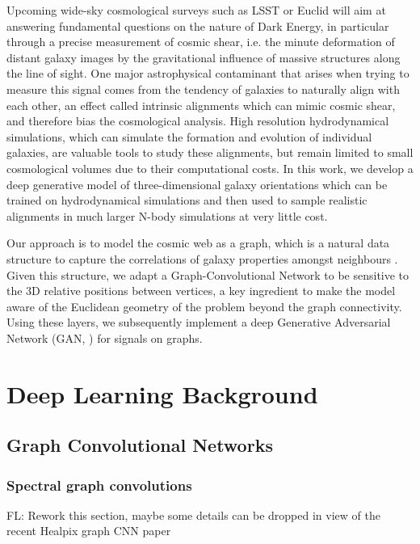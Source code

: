 \documentclass[a4paper,fleqn,usenatbib]{mnras}
\newcommand{\fl}[1]{{\color{magenta}FL: #1}}
\begin{document}
Upcoming wide-sky cosmological surveys such as LSST or Euclid will aim at answering fundamental questions on the 
nature of Dark Energy, in particular through a precise measurement of cosmic shear, i.e. the minute deformation of distant
galaxy images by the gravitational influence of massive structures along the line of sight. One major astrophysical contaminant
that arises when trying to measure this signal comes from the tendency of galaxies to naturally align with each other, an effect 
called  intrinsic alignments which can mimic cosmic shear, and therefore bias the cosmological analysis. High resolution
hydrodynamical simulations, which can simulate the formation and evolution of individual galaxies, are valuable tools 
to study these alignments, but remain limited to small cosmological volumes due to their computational costs. In this work,
we develop a deep generative model of three-dimensional galaxy orientations which can be trained on hydrodynamical
simulations and then used to sample realistic alignments in much larger N-body simulations at very little cost.

Our approach is to model the cosmic web as a graph, which is a natural data structure to capture the correlations of galaxy properties
amongst neighbours \cite{Coutinho2016}. Given this structure, we adapt a Graph-Convolutional Network \cite{Defferrard2016} to be sensitive
to the 3D relative positions between vertices, a key ingredient to make the model aware of the  Euclidean geometry of the problem beyond the graph connectivity. Using these layers, we subsequently implement a deep Generative Adversarial Network (GAN,  \cite{Goodfellow2014}) for signals on graphs.

\section{Deep Learning Background}

\subsection{Graph Convolutional Networks}

\subsubsection{Spectral graph convolutions}

\fl{Rework this section, maybe some details can be dropped in view of the recent Healpix graph CNN paper}
\end{document}
